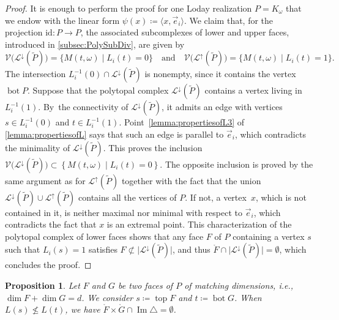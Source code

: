 \documentclass[10pt,a4paper]{amsart}
\newcommand{\ie}{i.e.,\xspace}
\numberwithin{equation}{section}\providecommand{\No}{}
\let\mathcal\mathscr
\theoremstyle{plain}
\newtheorem{proposition}{Proposition}
\theoremstyle{definition}
\newcommand{\K}{{K}}
\newcommand{\La}{\mathcal{L}}
\DeclareMathOperator{\tp}{top}
\DeclareMathOperator{\bm}{bot}
\newcommand{\ang}[1]{\langle #1\rangle}
\newcommand{\Ve}{\mathcal{V}}
\newcommand{\id}{\mathrm{id}}
\DeclareMathOperator{\im}{\mathrm{Im}}
\begin{document}
\begin{proof}
It is enough to perform the proof for one Loday realization $P=\K_\omega$ that we endow with the linear form
$\psi(x)\coloneqq \ang{x, \vec e_i}$.
We claim that, for the projection $\id : P \to P$, the associated subcomplexes of lower and upper faces, introduced in \cref{subsec:PolySubDiv}, are given by
\[\Ve\big(\La^{\downarrow}(\tilde P)\big)=\{
M(t,\omega)\mid L_i(t)=0
\}
\quad
\text{and}
\quad
\Ve\big(\La^{\uparrow}(\tilde P)\big)=\{
M(t,\omega)\mid L_i(t)=1
\}.
\]
The intersection $L_i^{-1}(0)\cap \La^{\downarrow}(\tilde P)$
is nonempty, since it contains the vertex $\bm P$. Suppose that the polytopal complex
$\La^{\downarrow}(\tilde P)$ contains a vertex living in $L_i^{-1}(1)$. By~the connectivity of $\La^{\downarrow}(\tilde P)$, it admits an edge with vertices $s\in L_i^{-1}(0)$ and $t\in L_i^{-1}(1)$.
Point~\eqref{lemma:propertiesofL3} of \cref{lemma:propertiesofL} says that such an edge is parallel to $\vec e_i$, which contradicts the minimality of $\La^{\downarrow}(\tilde P)$.
This proves the inclusion
$\Ve\big(\La^{\downarrow}(\tilde P)\big)
\subset
\left\{
M(t,\omega)\mid L_i(t)=0
\right\}$.
The opposite inclusion is proved by the same argument as for
$\La^{\uparrow}(\tilde P)$
together with the fact that
the union $\La^{\downarrow}(\tilde P)\cup \La^{\uparrow}(\tilde P)$ contains all the vertices of $P$.
If not, a vertex~$x$, which is not contained in it, is neither maximal nor minimal with respect to $\vec e_i$, which contradicts the fact that $x$ is an extremal point.
This characterization of the polytopal complex of lower faces shows that any face $F$ of $P$ containing a vertex $s$ such that $L_i(s) = 1$ satisfies
$ F\not \subset\vert\La^{\downarrow}(\tilde P)\vert$, and thus
$\mathring F \cap \big\vert\La^{\downarrow}(\tilde P)\big\vert=\emptyset$, which concludes the proof.
\end{proof}

\begin{proposition}\label{prop:FirstExclusion}
Let $F$ and $G$ be two faces of $P$ of matching dimensions, \ie $\dim F+\dim G=d$. We consider
$s\coloneqq \tp F$ and $t\coloneqq \bm G$.
When $L(s)\not\leq L(t)$, we have $\mathring{F}\times \mathring{G}\cap \im\triangle = \emptyset$.
\end{proposition}
\end{document}
